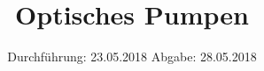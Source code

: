 

\subject{V21}
\title{Optisches Pumpen}
\date{
  Durchführung: 23.05.2018
  \hspace{3em}
  Abgabe: 28.05.2018
}



\maketitle
\newpage

%



%



\printbibliography


